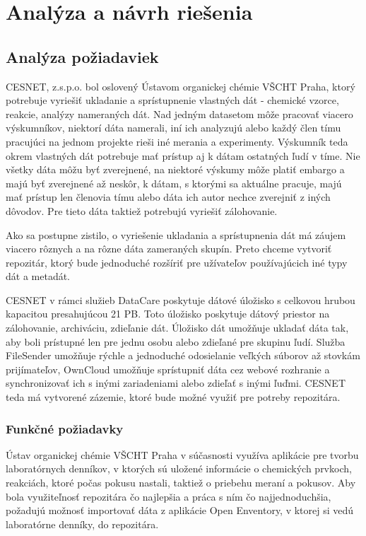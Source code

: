\documentclass[thesis=M,slovak]{FITthesis}[2013/05/06]
\begin{document}
\chapter{Analýza a návrh riešenia}
\section{Analýza požiadaviek}
CESNET, z.s.p.o. bol oslovený Ústavom organickej chémie VŠCHT Praha, ktorý potrebuje vyriešiť ukladanie a sprístupnenie vlastných dát - chemické vzorce, reakcie, analýzy nameraných dát. Nad jedným datasetom môže pracovať viacero výskumníkov, niektorí dáta namerali, iní ich analyzujú alebo každý člen tímu pracujúci na jednom projekte rieši iné merania a experimenty. Výskumník teda okrem vlastných dát potrebuje mať prístup aj k dátam ostatných ľudí v tíme. Nie všetky dáta môžu byť zverejnené, na niektoré výskumy môže platiť embargo a majú byť zverejnené až neskôr, k dátam, s ktorými sa aktuálne pracuje, majú mať prístup len členovia tímu alebo dáta ich autor nechce zverejniť z iných dôvodov. Pre tieto dáta taktiež potrebujú vyriešiť zálohovanie.

Ako sa postupne zistilo, o vyriešenie ukladania a sprístupnenia dát má záujem viacero rôznych a na rôzne dáta zameraných skupín. Preto chceme vytvoriť repozitár, ktorý bude jednoduché rozšíriť pre užívateľov používajúcich iné typy dát a metadát.

CESNET v rámci služieb DataCare poskytuje dátové úložisko s celkovou hrubou kapacitou presahujúcou 21 PB. Toto úložisko poskytuje dátový priestor na zálohovanie, archiváciu, zdieľanie dát. \cite{DataCare} Úložisko dát umožňuje ukladať dáta tak, aby boli prístupné len pre jednu osobu alebo zdieľané pre skupinu ľudí. Služba FileSender umožňuje rýchle a jednoduché odosielanie veľkých súborov až stovkám prijímateľov, OwnCloud umožňuje sprístupniť dáta cez webové rozhranie a synchronizovať ich s inými zariadeniami alebo zdieľať s inými ľuďmi. \cite {DatoveUloziste} CESNET teda má vytvorené zázemie, ktoré bude možné využiť pre potreby repozitára.

\subsection{Funkčné požiadavky}

Ústav organickej chémie VŠCHT Praha v súčasnosti využíva aplikácie pre tvorbu laboratórnych denníkov, v ktorých sú uložené informácie o chemických prvkoch, reakciách, ktoré počas pokusu nastali, taktiež o priebehu meraní a pokusov. Aby bola využiteľnosť repozitára čo najlepšia a práca s ním čo najjednoduchšia, požadujú možnosť importovať dáta z aplikácie Open Enventory, v ktorej si vedú laboratórne denníky, do repozitára. 
\end{document}
